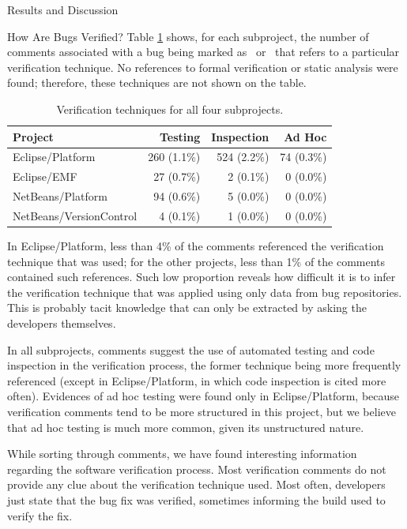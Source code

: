 \begin{section}{Results and Discussion}
\begin{subsection}{How Are Bugs Verified?}
	Table \ref{tab:how} shows, for each subproject, the number of comments associated with a bug being marked as \VERIFIED\ or \REOPENED\ that refers to a particular verification technique. No references to formal verification or static analysis were found; therefore, these techniques are not shown on the table.

	\begin{table}
		\begin{center}
		\caption{Verification techniques for all four subprojects.} \label{tab:how}
		\begin{tabular}{l|r|r|r}
			\textbf{\centering Project} & 
			\textbf{\centering Testing} & 
			\textbf{\centering Inspection} & 
			\textbf{\centering Ad Hoc} \\
			\hline
			Eclipse/Platform        & 260 (1.1\%) & 524 (2.2\%) & 74 (0.3\%) \\
			Eclipse/EMF             & 27 (0.7\%) & 2 (0.1\%) & 0 (0.0\%) \\
			NetBeans/Platform       & 94 (0.6\%) & 5 (0.0\%) & 0 (0.0\%) \\
			NetBeans/VersionControl & 4 (0.1\%) & 1 (0.0\%) & 0 (0.0\%) 
		\end{tabular}
		\end{center}
	\end{table}

	In Eclipse/Platform, less than 4\% of the comments referenced the verification technique that was used; for the other projects, less than 1\% of the comments contained such references. Such low proportion reveals how difficult it is to infer the verification technique that was applied using only data from bug repositories. This is probably tacit knowledge that can only be extracted by asking the developers themselves.
	
	In all subprojects, comments suggest the use of automated testing and code inspection in the verification process, the former technique being more frequently referenced (except in Eclipse/Platform, in which code inspection is cited more often). Evidences of ad hoc testing were found only in Eclipse/Platform, because verification comments tend to be more structured in this project, but we believe that ad hoc testing is much more common, given its unstructured nature.
	
	While sorting through comments, we have found interesting information regarding the software verification process. Most verification comments do not provide any clue about the verification technique used. Most often, developers just state that the bug fix was verified, sometimes informing the build used to verify the fix. 
  

\end{subsection}
\end{section}
